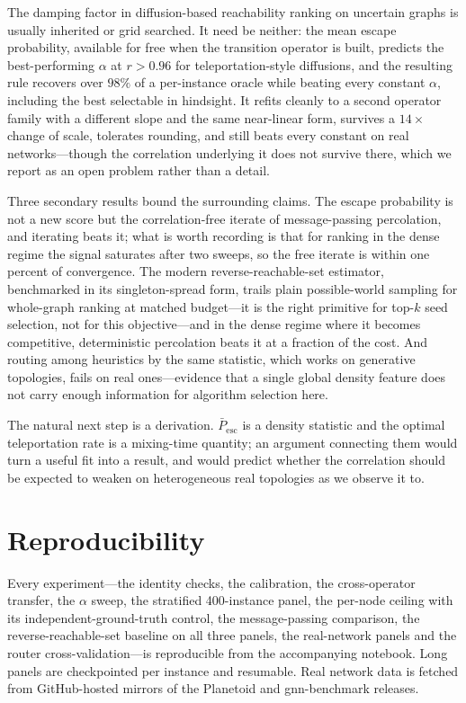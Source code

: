 \documentclass[11pt,a4paper]{article}
\newcommand{\Pescbar}{\bar{P}_{\mathrm{esc}}}
\begin{document}
The damping factor in diffusion-based reachability ranking on uncertain graphs
is usually inherited or grid searched. It need be neither: the mean escape
probability, available for free when the transition operator is built, predicts
the best-performing $\alpha$ at $r>0.96$ for teleportation-style diffusions, and
the resulting rule recovers over $98\%$ of a per-instance oracle while beating
every constant $\alpha$, including the best selectable in hindsight. It refits
cleanly to a second operator family with a different slope and the same
near-linear form, survives a $14\times$ change of scale, tolerates rounding, and
still beats every constant on real networks---though the correlation underlying
it does not survive there, which we report as an open problem rather than a
detail.

Three secondary results bound the surrounding claims. The escape probability is
not a new score but the correlation-free iterate of message-passing percolation,
and iterating beats it; what is worth recording is that for ranking in the dense
regime the signal saturates after two sweeps, so the free iterate is within one
percent of convergence. The modern reverse-reachable-set estimator, benchmarked
in its singleton-spread form, trails plain possible-world sampling for
whole-graph ranking at matched budget---it is the right primitive for top-$k$
seed selection, not for this objective---and in the dense regime where it
becomes competitive, deterministic percolation beats it at a fraction of the
cost. And routing among heuristics by the same statistic,
which works on generative topologies, fails on real ones---evidence that a single
global density feature does not carry enough information for algorithm selection
here.

The natural next step is a derivation. $\Pescbar$ is a density statistic and the
optimal teleportation rate is a mixing-time quantity; an argument connecting
them would turn a useful fit into a result, and would predict whether the
correlation should be expected to weaken on heterogeneous real topologies as we
observe it to.

\section*{Reproducibility}

Every experiment---the identity checks, the calibration, the cross-operator
transfer, the $\alpha$ sweep, the stratified 400-instance panel, the per-node
ceiling with its independent-ground-truth control, the message-passing
comparison, the reverse-reachable-set baseline on all three panels, the
real-network panels and the router cross-validation---is
reproducible from the accompanying notebook. Long panels are checkpointed per
instance and resumable. Real network data is fetched from GitHub-hosted mirrors
of the Planetoid and gnn-benchmark releases.
\end{document}
